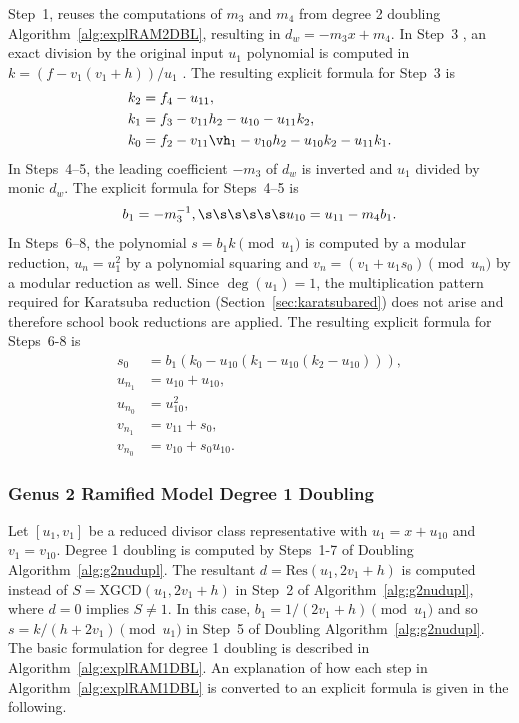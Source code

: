Step~1, reuses the computations of $m_3$ and $m_4$ from  degree 2 doubling
Algorithm~\ref{alg:explRAM2DBL}, resulting in $d_w = -m_3x + m_4$. In Step~3 ,
an exact division by the original input $u_1$ polynomial is computed in $k = (f
- v_1(v_1 + h))/u_1$ . The resulting explicit formula for Step~3 is 
\begin{align*}
    k_2 &= f_4 - u_{11},\\
    k_1 &= f_3 - v_{11}h_2 - u_{10} - u_{11}k_2,\\
    k_0 &= f_2 - v_{11}\vh_1 - v_{10}h_2 - u_{10}k_2 - u_{11}k_1.
\end{align*} In Steps~4--5, the leading coefficient $-m_3$ of $d_w$ is inverted and $u_1$
divided by monic $d_w$. The explicit formula for Steps~4--5 is $$b_1 =
-m_3^{-1}, \s\s\s\s\s\s u_{10} = u_{11} - m_4b_1.$$ In Steps~6--8, the
polynomial $s = b_1k \pmod{u_1}$ is computed by a modular reduction, $u_n =
u_1^2$ by a polynomial squaring and $v_n = (v_1 + u_1s_0) \pmod{u_n}$ by a
modular reduction as well. Since $\deg(u_1) = 1$, the multiplication pattern
required for Karatsuba reduction (Section~\ref{sec:karatsubared}) does not arise
and therefore school book reductions are applied.  The resulting explicit
formula for Steps~6-8 is
\begin{align*}
    s_0 &= b_1(k_0 - u_{10}(k_1 - u_{10}(k_2 - u_{10}))),\\
u_{n_1} &= u_{10} + u_{10},\\
u_{n_0} &= u_{10}^2,\\
v_{n_1} &= v_{11} + s_0,\\
v_{n_0} &= v_{10} + s_0u_{10}.    
\end{align*}


\subsubsection{Genus 2 Ramified Model Degree 1 Doubling}
Let $[u_1,v_1]$ be a reduced divisor class representative with $u_1 = x +
u_{10}$ and $v_1 = v_{10}$.  Degree 1 doubling is computed by Steps~1-7 of
Doubling Algorithm~\ref{alg:g2nudupl}. The resultant $d =
\mathrm{Res}(u_1,2v_1+h)$ is computed instead of $S = \mathrm{XGCD}(u_1,2v_1 +
h)$ in Step~2 of Algorithm~\ref{alg:g2nudupl}, where $d=0$ implies $S \neq 1$.
In this case, $b_1 = 1/(2v_1 + h) \pmod{u_1}$ and so $s = k/(h + 2v_1)
\pmod{u_1}$ in Step~5 of Doubling Algorithm~\ref{alg:g2nudupl}. The basic
formulation for degree 1 doubling is described in
Algorithm~\ref{alg:explRAM1DBL}. An explanation of how each step in
Algorithm~\ref{alg:explRAM1DBL} is converted to an explicit formula is given in
the following.

